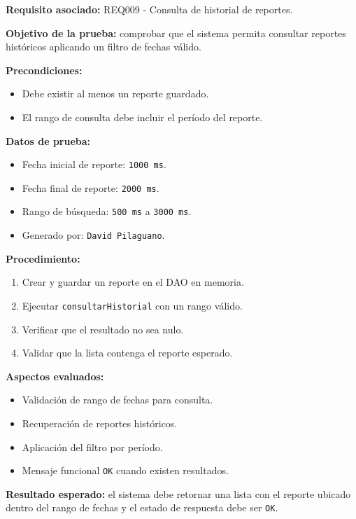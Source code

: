 \documentclass[12pt,a4paper]{article}
\begin{document}
\textbf{Requisito asociado:} REQ009 - Consulta de historial de reportes.

\textbf{Objetivo de la prueba:} comprobar que el sistema permita consultar reportes históricos aplicando un filtro de fechas válido.

\textbf{Precondiciones:}
\begin{itemize}[leftmargin=*]
    \item Debe existir al menos un reporte guardado.
    \item El rango de consulta debe incluir el período del reporte.
\end{itemize}

\textbf{Datos de prueba:}
\begin{itemize}[leftmargin=*]
    \item Fecha inicial de reporte: \texttt{1000 ms}.
    \item Fecha final de reporte: \texttt{2000 ms}.
    \item Rango de búsqueda: \texttt{500 ms} a \texttt{3000 ms}.
    \item Generado por: \texttt{David Pilaguano}.
\end{itemize}

\textbf{Procedimiento:}
\begin{enumerate}[leftmargin=*]
    \item Crear y guardar un reporte en el DAO en memoria.
    \item Ejecutar \texttt{consultarHistorial} con un rango válido.
    \item Verificar que el resultado no sea nulo.
    \item Validar que la lista contenga el reporte esperado.
\end{enumerate}

\textbf{Aspectos evaluados:}
\begin{itemize}[leftmargin=*]
    \item Validación de rango de fechas para consulta.
    \item Recuperación de reportes históricos.
    \item Aplicación del filtro por período.
    \item Mensaje funcional \texttt{OK} cuando existen resultados.
\end{itemize}

\textbf{Resultado esperado:} el sistema debe retornar una lista con el reporte ubicado dentro del rango de fechas y el estado de respuesta debe ser \texttt{OK}.
\end{document}
